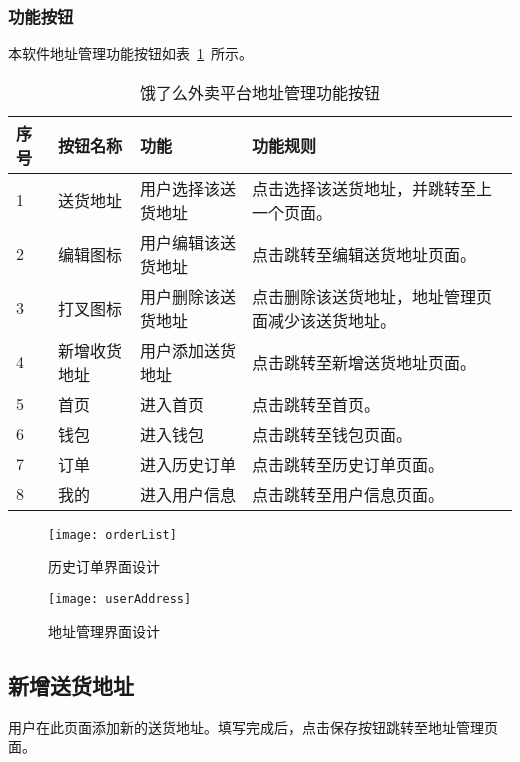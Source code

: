 \subsubsection{功能按钮}
本软件地址管理功能按钮如表~\ref{tab:table13}~所示。
\begin{table}[htbp]
    \caption{饿了么外卖平台地址管理功能按钮}\label{tab:table13}
    \vspace{0.5em}\wuhao
    \begin{tabularx}{\textwidth}{lllX}
    \toprule[1.5pt]
    序号 & 按钮名称 & 功能 & 功能规则 \\ 
    \midrule[1pt]
    1 & 送货地址 & 用户选择该送货地址 & 点击选择该送货地址，并跳转至上一个页面。 \\
    2 & 编辑图标 & 用户编辑该送货地址 & 点击跳转至编辑送货地址页面。 \\
    3 & 打叉图标 & 用户删除该送货地址 & 点击删除该送货地址，地址管理页面减少该送货地址。 \\
    4 & 新增收货地址 & 用户添加送货地址 & 点击跳转至新增送货地址页面。 \\
    5 & 首页 & 进入首页 & 点击跳转至首页。 \\
    6 & 钱包 & 进入钱包 & 点击跳转至钱包页面。 \\
    7 & 订单 & 进入历史订单 & 点击跳转至历史订单页面。 \\
    8 & 我的 & 进入用户信息 & 点击跳转至用户信息页面。 \\
\bottomrule[1.5pt]
\end{tabularx}
\vspace{\baselineskip}
\end{table}
\begin{figure}[htbp]
    \centering
    \begin{minipage}{0.4\textwidth}
    \centering
    \texttt{[image: orderList]}
    \caption{历史订单界面设计}\label{fig:orderList}
    \end{minipage}
    \begin{minipage}{0.4\textwidth}
    \centering
    \texttt{[image: userAddress]}
    \caption{地址管理界面设计}\label{fig:userAddress}
    \end{minipage}
    \vspace{\baselineskip}
\end{figure}

\subsection{新增送货地址}
用户在此页面添加新的送货地址。填写完成后，点击保存按钮跳转至地址管理页面。
